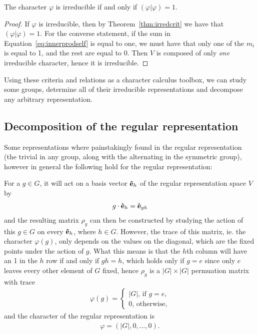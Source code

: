 \begin{theorem}
	The character $\varphi$ is irreducible if and only if $(\varphi|\varphi) = 1$.
\end{theorem}
\begin{proof}
	If $\varphi$ is irreducible, then by Theorem~\ref{thm:irredcrit} we have that $(\varphi|\varphi) = 1$. For the converse statement, if the sum in Equation~\ref{eq:innerprodself} is equal to one, we must have that only one of the $m_i$ is equal to 1, and the rest are equal to 0. Then $V$ is composed of only \textit{one} irreducible character, hence it is irreducible.
\end{proof}


Using these criteria and relations as a character calculus toolbox, we can study some groups, determine all of their irreducible representations and decompose any arbitrary representation.

\subsection{Decomposition of the regular representation}

Some representations where painstakingly found in the regular representation (the trivial in any group, along with the alternating in the symmetric group), however in general the following hold for the regular representation:

For a $g \in G$, it will act on a basis vector $\mathbf{\hat{e}}_h$ of the regular representation space $V$ by
\begin{align*}
	g \cdot \mathbf{\hat{e}}_{h} = \mathbf{\hat{e}}_{gh}
\end{align*}
and the resulting matrix $\rho_g$ can then be constructed by studying the action of this $g \in G$ on every $\mathbf{\hat{e}}_h$, where $h \in G$. However, the trace of this matrix, ie. the character $\varphi(g)$, only depends on the values on the diagonal, which are the fixed points under the action of $g$. What this means is that the $h$th column will have an 1 in the $h$ row if and only if $gh = h$, which holds only if $g = e$ since only $e$ leaves every other element of $G$ fixed, hence $\rho_g$ is a $|G| \times |G|$ permuation matrix with trace
\begin{align*}
	\varphi(g) = \begin{cases}
		|G| \text{, if $g = e$,} \\
		0 \text{, otherwise,}
	\end{cases}
\end{align*}
and the character of the regular representation is 
\begin{align*}
	\varphi = (|G|, 0, \dots, 0).
\end{align*}

